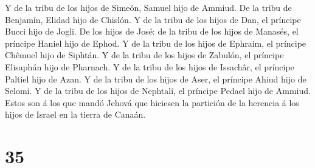  Y de la tribu de los hijos de Simeón, Samuel hijo de
Ammiud.  De la tribu de Benjamín, Elidad hijo de Chislón.
 Y de la tribu de los hijos de Dan, el príncipe Bucci hijo
de Jogli.  De los hijos de José: de la tribu de los hijos
de Manasés, el príncipe Haniel hijo de Ephod.  Y de la
tribu de los hijos de Ephraim, el príncipe Chêmuel hijo de Siphtán.
 Y de la tribu de los hijos de Zabulón, el príncipe
Elisaphán hijo de Pharnach.  Y de la tribu de los hijos de
Issachâr, el príncipe Paltiel hijo de Azan.  Y de la tribu
de los hijos de Aser, el príncipe Ahiud hijo de Selomi.  Y
de la tribu de los hijos de Nephtalí, el príncipe Pedael hijo de Ammiud.
 Estos son á los que mandó Jehová que hiciesen la partición
de la herencia á los hijos de Israel en la tierra de Canaán.

\hypertarget{section-34}{%
\section{35}\label{section-34}}

